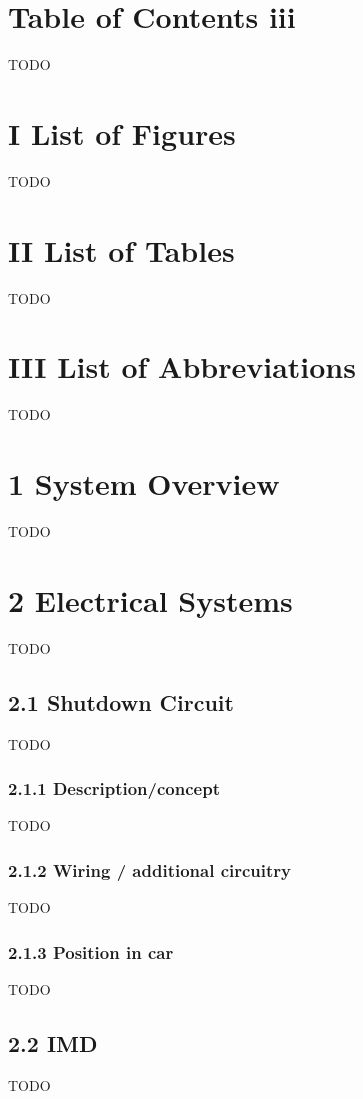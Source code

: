 \documentclass{article}
\begin{document}
\section*{Table of Contents iii}
TODO

\section*{I List of Figures}
TODO

\section*{II List of Tables}
TODO

\section*{III List of Abbreviations}
TODO

\section*{1 System Overview}
TODO

\section*{2 Electrical Systems}
TODO

\subsection*{2.1 Shutdown Circuit}
TODO

\subsubsection*{2.1.1 Description/concept}
TODO

\subsubsection*{2.1.2 Wiring / additional circuitry}
TODO

\subsubsection*{2.1.3 Position in car}
TODO

\subsection*{2.2 IMD}
TODO
\end{document}
